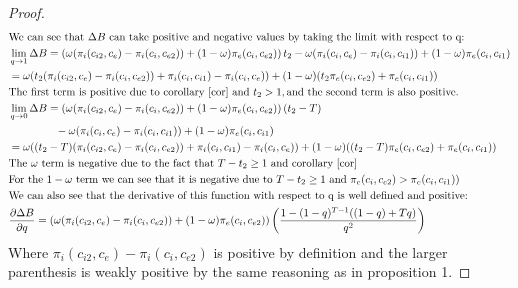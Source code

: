 \documentclass[12pt]{report}
\numberwithin{equation}{section}
\begin{document}
\begin{proof}
\begin{align*}
&\text{We can see that } \Delta B \text{ can take positive and negative values by taking the limit with respect to q:} \\
&\lim_{q \to 1}\Delta B = \left(\omega (\pi_{i}(c_{i2},c_{e})- \pi_{i}(c_{i},c_{e2}))+(1-\omega)\pi_{e}(c_{i},c_{e2}) \right) t_2
-\omega(\pi_i(c_i,c_{e})-\pi_i(c_i,c_{i1}))+(1-\omega)\pi_e(c_i,c_{i1})
\\
& = \omega (t_2 (\pi_{i}(c_{i2},c_{e})- \pi_{i}(c_{i},c_{e2})) + \pi_i(c_i,c_{i1}) -\pi_i(c_i,c_{e}) ) 
+ (1-\omega)(t_2 \pi_{e}(c_{i},c_{e2}) + \pi_e(c_i,c_{i1}))
\\
& \text{The first term is positive due to corollary \ref{cor} and } t_2>1, \text{and the second term is also positive. } \\
&\lim_{q \to 0}\Delta B = \left(\omega (\pi_{i}(c_{i2},c_{e})- \pi_{i}(c_{i},c_{e2}))+(1-\omega)\pi_{e}(c_{i},c_{e2}) \right) (t_2-T)
\\
& ~~~~~~~~~~~~~  -\omega(\pi_i(c_i,c_{e})-\pi_i(c_i,c_{i1}))+(1-\omega)\pi_e(c_i,c_{i1})
\\
& = \omega ((t_2-T) (\pi_{i}(c_{i2},c_{e})- \pi_{i}(c_{i},c_{e2})) + \pi_i(c_i,c_{i1}) -\pi_i(c_i,c_{e}) ) 
+ (1-\omega)((t_2-T) \pi_{e}(c_{i},c_{e2}) + \pi_e(c_i,c_{i1}))
\\
& \text{The $\omega$ term is negative due to the fact that } T-t_2 \geq 1 \text{ and  corollary \ref{cor}} 
\\
& \text{For the $1-\omega$ term we can see that it is negative due to } T-t_2 \geq 1 \text{ and } \pi_{e}(c_{i},c_{e2})>\pi_e(c_i,c_{i1})) \\
& \text{We can also see that the derivative of this function with respect to q is well defined and positive:} \\
&\frac{\partial \Delta B}{\partial q} = \left(\omega (\pi_{i}(c_{i2},c_{e})- \pi_{i}(c_{i},c_{e2}))+(1-\omega)\pi_{e}(c_{i},c_{e2}) \right) \left(\frac{1-(1-q)^{T-1}((1-q)+T q) }{q^2} \right)
\end{align*}
Where $\pi_{i}(c_{i2},c_{e})- \pi_{i}(c_{i},c_{e2})$ is positive by definition and the larger parenthesis is weakly positive by the same reasoning as in proposition 1. 
\end{proof}
\end{document}
